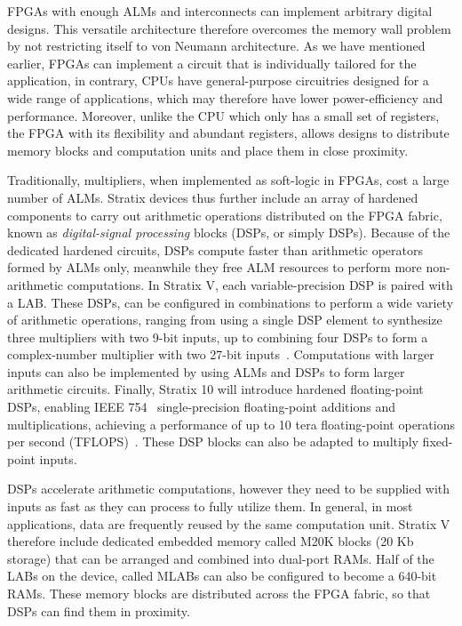 FPGAs with enough ALMs and interconnects can implement arbitrary digital
designs.  This versatile architecture therefore overcomes the memory wall
problem by not restricting itself to von Neumann architecture.  As we have
mentioned earlier, FPGAs can implement a circuit that is individually tailored
for the application, in contrary, CPUs have general-purpose circuitries
designed for a wide range of applications, which may therefore have lower
power-efficiency and performance.  Moreover, unlike the CPU which only has a
small set of registers, the FPGA with its flexibility and abundant registers,
allows designs to distribute memory blocks and computation units and place them
in close proximity.

Traditionally, multipliers, when implemented as soft-logic in FPGAs, cost
a large number of ALMs.  Stratix devices thus further include an array of
hardened components to carry out arithmetic operations distributed on the
FPGA fabric, known as \emph{digital-signal processing} blocks (DSPs, or
simply DSPs).  Because of the dedicated hardened circuits, DSPs compute
faster than arithmetic operators formed by ALMs only, meanwhile they free ALM
resources to perform more non-arithmetic computations.  In Stratix V, each
variable-precision DSP is paired with a LAB\@.  These DSPs, can be configured
in combinations to perform a wide variety of arithmetic operations, ranging
from using a single DSP element to synthesize three multipliers with two
9-bit inputs, up to combining four DSPs to form a complex-number multiplier
with two 27-bit inputs~\cite{stratix5}.  Computations with larger inputs
can also be implemented by using ALMs and DSPs to form larger arithmetic
circuits.  Finally, Stratix 10 will introduce hardened floating-point DSPs,
enabling IEEE 754~\cite{ieee754} single-precision floating-point additions
and multiplications, achieving a performance of up to 10 tera floating-point
operations per second (TFLOPS)~\cite{stratix10fp}.  These DSP blocks can also
be adapted to multiply fixed-point inputs.

DSPs accelerate arithmetic computations, however they need to be supplied with
inputs as fast as they can process to fully utilize them.  In general, in
most applications, data are frequently reused by the same computation unit.
Stratix V therefore include dedicated embedded memory called M20K blocks (20 Kb
storage) that can be arranged and combined into dual-port RAMs.  Half of the
LABs on the device, called MLABs can also be configured to become a 640-bit
RAMs.  These memory blocks are distributed across the FPGA fabric, so that DSPs
can find them in proximity.


